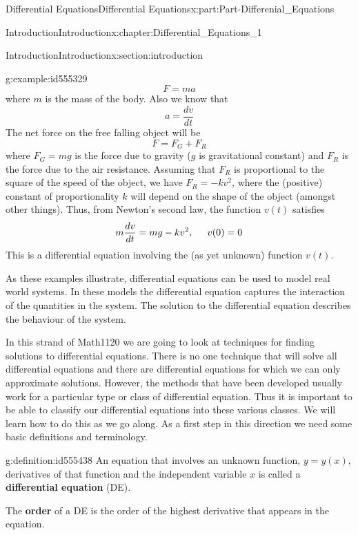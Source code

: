 \documentclass[oneside,10pt,]{book}
\newcommand{\terminology}[1]{\textbf{#1}}
\numberwithin{equation}{section}
\begin{document}
\begin{partptx}{Differential Equations}{}{Differential Equations}{}{}{x:part:Part-Differenial_Equations}
\begin{chapterptx}{Introduction}{}{Introduction}{}{}{x:chapter:Differential_Equations_1}
\begin{sectionptx}{Introduction}{}{Introduction}{}{}{x:section:introduction}
\begin{example}{}{g:example:id555329}
\begin{equation*}
F=ma
\end{equation*}
where \(m\) is the mass of the body. Also we know that%
\begin{equation*}
a=\frac{dv}{dt} 
\end{equation*}
The net force on the free falling object will be%
\begin{equation*}
F=F_G+F_R
\end{equation*}
where \(F_G=mg\) is the force due to gravity (\(g\) is gravitational constant) and \(F_R\) is the force due to the air resistance. Assuming that \(F_R\) is proportional to the square of the speed of the object, we have \(F_R=-kv^2\), where the (positive) constant of proportionality \(k\) will depend on the shape of the object (amongst other things). Thus, from Newton’s second law, the function \(v(t)\) satisfies%
\begin{equation*}
m\frac{dv}{dt}=mg-kv^2, \hspace{5mm} v(0)=0 
\end{equation*}
This is a differential equation involving the (as yet unknown) function \(v(t)\).%
\end{example}
As these examples illustrate, differential equations can be used to model real world systems. In these models the differential equation captures the interaction of the quantities in the system. The solution to the differential equation describes the behaviour of the system.%
\par
In this strand of Math1120 we are going to look at techniques for finding solutions to differential equations. There is no one technique that will solve all differential equations and there are differential equations for which we can only approximate solutions. However, the methods that have been developed usually work for a particular type or class of differential equation. Thus it is important to be able to classify our differential equations into these various classes. We will learn how to do this as we go along. As a first step in this direction we need some basic definitions and terminology.%
\begin{definition}{}{g:definition:id555438}%
An equation that involves an unknown function, \(y=y(x)\), derivatives of that function and the independent variable \(x\) is called a \terminology{differential equation} (DE).%
\par
The \terminology{order} of a DE is the order of the highest derivative that appears in the equation.%
\par

\end{definition}
\end{sectionptx}
\end{chapterptx}
\end{partptx}
\end{document}
